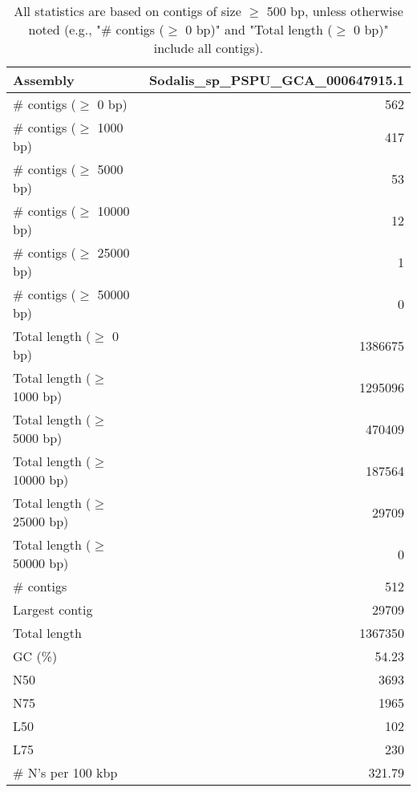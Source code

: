 \documentclass[12pt,a4paper]{article}
\begin{document}
\begin{table}[ht]
\begin{center}
\caption{All statistics are based on contigs of size $\geq$ 500 bp, unless otherwise noted (e.g., "\# contigs ($\geq$ 0 bp)" and "Total length ($\geq$ 0 bp)" include all contigs).}
\begin{tabular}{|l*{1}{|r}|}
\hline
Assembly & Sodalis\_sp\_PSPU\_GCA\_000647915.1 \\ \hline
\# contigs ($\geq$ 0 bp) & 562 \\ \hline
\# contigs ($\geq$ 1000 bp) & 417 \\ \hline
\# contigs ($\geq$ 5000 bp) & 53 \\ \hline
\# contigs ($\geq$ 10000 bp) & 12 \\ \hline
\# contigs ($\geq$ 25000 bp) & 1 \\ \hline
\# contigs ($\geq$ 50000 bp) & 0 \\ \hline
Total length ($\geq$ 0 bp) & 1386675 \\ \hline
Total length ($\geq$ 1000 bp) & 1295096 \\ \hline
Total length ($\geq$ 5000 bp) & 470409 \\ \hline
Total length ($\geq$ 10000 bp) & 187564 \\ \hline
Total length ($\geq$ 25000 bp) & 29709 \\ \hline
Total length ($\geq$ 50000 bp) & 0 \\ \hline
\# contigs & 512 \\ \hline
Largest contig & 29709 \\ \hline
Total length & 1367350 \\ \hline
GC (\%) & 54.23 \\ \hline
N50 & 3693 \\ \hline
N75 & 1965 \\ \hline
L50 & 102 \\ \hline
L75 & 230 \\ \hline
\# N's per 100 kbp & 321.79 \\ \hline
\end{tabular}
\end{center}
\end{table}
\end{document}
